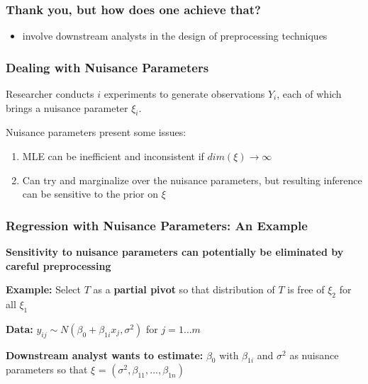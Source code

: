 \documentclass[10pt, compress]{beamer}
\begin{document}
\begin{frame}[fragile]
    \frametitle{Thank you, but how does one achieve that?}
    \begin{itemize}
        \item involve downstream analysts in the design of preprocessing techniques
    \end{itemize}
\end{frame}

\begin{frame}[fragile]
    \frametitle{Dealing with Nuisance Parameters}

    Researcher conducts $i$ experiments to generate observations $Y_i$, each of which brings a nuisance parameter $\xi_i$. 
    
    
    Nuisance parameters present some issues:
    \begin{enumerate}
    \item MLE can be inefficient and inconsistent if $dim(\xi) \to\infty$
    \item Can try and marginalize over the nuisance parameters, but resulting inference can be sensitive to the prior on $\xi$
    \end{enumerate}
    
\end{frame}

\begin{frame}[fragile]

    \frametitle{Regression with Nuisance Parameters: An Example}
    
    \textbf{Sensitivity to nuisance parameters can potentially be eliminated by careful preprocessing}

    \vspace*{5mm}
    
    \textbf{Example:} Select $T$ as a \textbf{partial pivot} so that distribution of $T$ is free of $\xi_2$ for all $\xi_1$ 

    \vspace*{5mm}
    
    \textbf{Data:} $y_{ij} \sim N(\beta_0 + \beta_{1i}x_j, \sigma^2)$ for $j = 1 \ldots m$
    
    \textbf{Downstream analyst wants to estimate:} $\beta_0$ with $\beta_{1i}$ and $\sigma^2$ as nuisance parameters so that $\xi$ = $(\sigma^2, \beta_{11}, ..., \beta_{1n})$
    
\end{frame}
\end{document}
